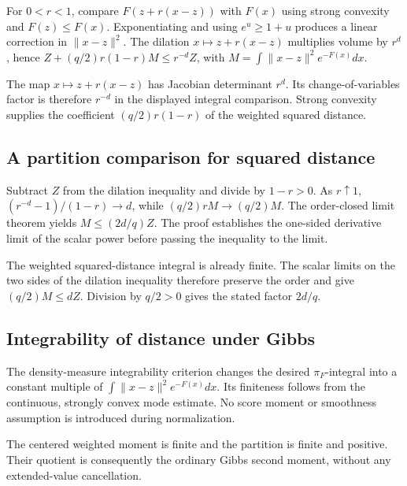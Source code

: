 \documentclass[11pt,a4paper]{report}
\begin{document}
For \(0<r<1\), compare \(F(z+r(x-z))\) with \(F(x)\) using strong convexity and \(F(z)\le F(x)\). Exponentiating and using \(e^u\ge1+u\) produces a linear correction in \(\|x-z\|^2\). The dilation \(x\mapsto z+r(x-z)\) multiplies volume by \(r^d\), hence \(Z+(q/2)r(1-r)M\le r^{-d}Z\), with \(M=\int\|x-z\|^2e^{-F(x)}dx\).



The map \(x\mapsto z+r(x-z)\) has Jacobian determinant \(r^d\). Its change-of-variables factor is therefore \(r^{-d}\) in the displayed integral comparison. Strong convexity supplies the coefficient \((q/2)r(1-r)\) of the weighted squared distance.

\subsection{\texorpdfstring{A partition comparison for squared distance}{A partition comparison for squared distance}}
\label{report-step-UnadjustedLangevin-GibbsConcentration-lean-5}


Subtract \(Z\) from the dilation inequality and divide by \(1-r>0\). As \(r\uparrow1\), \((r^{-d}-1)/(1-r)\to d\), while \((q/2)rM\to(q/2)M\). The order-closed limit theorem yields \(M\le(2d/q)Z\). The proof establishes the one-sided derivative limit of the scalar power before passing the inequality to the limit.



The weighted squared-distance integral is already finite. The scalar limits on the two sides of the dilation inequality therefore preserve the order and give \((q/2)M\le dZ\). Division by \(q/2>0\) gives the stated factor \(2d/q\).

\subsection{\texorpdfstring{Integrability of distance under Gibbs}{Integrability of distance under Gibbs}}
\label{report-step-UnadjustedLangevin-GibbsConcentration-lean-6}


The density-measure integrability criterion changes the desired \(\pi_F\)-integral into a constant multiple of \(\int\|x-z\|^2e^{-F(x)}dx\). Its finiteness follows from the continuous, strongly convex mode estimate. No score moment or smoothness assumption is introduced during normalization.



The centered weighted moment is finite and the partition is finite and positive. Their quotient is consequently the ordinary Gibbs second moment, without any extended-value cancellation.
\end{document}

